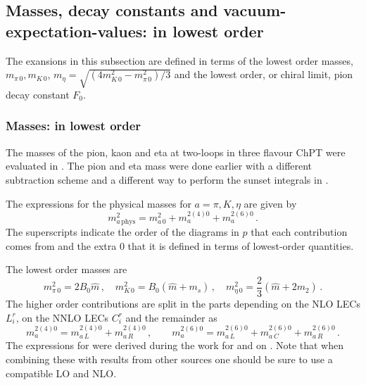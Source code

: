 \documentclass[12pt,a4paper]{article}
\begin{document}
\subsection{Masses, decay constants and vacuum-expectation-values: in lowest order}
\label{massdecayvevlo}

The exansions in this subsection are defined in terms of the
lowest order masses,
$m_{\pi\,0}, m_{K\,0}$, $m_\eta=\sqrt{(4m_{K\,0}^2-m_{\pi\,0}^2)/3}$ and the 
lowest order, or chiral limit, pion decay constant $F_0$.

\subsubsection{Masses: in lowest order}
\label{masseslo}

The masses of the pion, kaon and eta at two-loops in three flavour ChPT
were evaluated in \cite{Amoros:1999dp}. The pion and eta mass were done
earlier with a different subtraction scheme and a different way to perform the
sunset integrals in \cite{Golowich:1997zs}.

The expressions for the physical masses for $a=\pi,K,\eta$ are given by
\begin{equation}
\label{massesinlo}
m_{a\,\mathrm{phys}}^2 = m_{a\,0}^2+m_a^{2(4)0}+m_a^{2(6)0}\,.
\end{equation}
The superscripts indicate the order of the diagrams in $p$ that each
contribution comes from and the extra $0$ that it is defined in terms
of lowest-order quantities.
 
The lowest order masses are
\begin{equation}
m_{\pi\,0}^2 = 2 B_0\hat m\,,\quad m_{K\,0}^2 = B_0\left(\hat m+m_s\right)\,,
\quad m_{\eta\,0}^2 = \frac{2}{3}\left(\hat m+2m_2\right)\,.
\end{equation}
The higher order contributions are split in the parts
depending on the NLO LECs $L_i^r$, on the NNLO LECs $C_i^r$ and the
remainder as
\begin{equation}
\label{defmasseslo}
m_a^{2(4)0}=m_{a\,L}^{2(4)0}+m_{a\,R}^{2(4)0}\,,
\qquad
m_a^{2(6)0}=m_{a\,L}^{2(6)0}+m_{a\,C}^{2(6)0}+m_{a\,R}^{2(6)0}\,.
\end{equation}
The expressions for were derived during the work for \cite{Amoros:1999dp}
and on \cite{webpage}. Note that when combining these with results
from other sources one should be sure to use a compatible LO and NLO.\\
\end{document}
